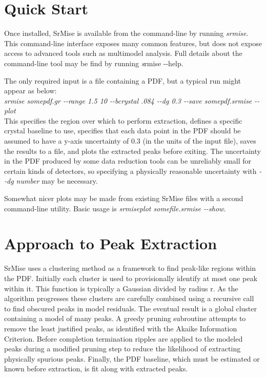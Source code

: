 \documentclass[12pt]{article}
\begin{document}
\section{Quick Start}

Once installed, {\sc SrMise} is available from the command-line by running \emph{srmise}.  This command-line interface exposes many common features, but does not expose access to advanced tools such as multimodel analysis.  Full details about the command-line tool may be find by running {\emph srmise -{}-help}.

The only required input is a file containing a PDF, but a typical run might appear as below:\\
\emph{srmise somepdf.gr -{}-range 1.5 10 -{}-bcrystal .084  -{}-dg 0.3 -{}-save somepdf.srmise -{}-plot}\\
This specifies the region over which to perform extraction, defines a specific crystal baseline to use, specifies that each data point in the PDF should be assumed to have a y-axis uncertainty of 0.3 (in the units of the input file), saves the results to a file, and plots the extracted peaks before exiting.  The uncertainty in the PDF produced by some data reduction tools can be unreliably small for certain kinds of detectors, so specifying a physically reasonable uncertainty with \emph{-{}-dg number} may be necessary.

Somewhat nicer plots may be made from existing {\sc SrMise} files with a second command-line utility.  Basic usage is \emph{srmiseplot somefile.srmise -{}-show}.

\section{Approach to Peak Extraction}
{\sc SrMise} uses a clustering method as a framework to find peak-like regions within the PDF.  Initially each cluster is used to provisionally identify at most one peak within it. This function is typically a Gaussian divided by radius r.  As the algorithm progresses these clusters are carefully combined using a recursive call to find obscured peaks in model residuals. The eventual result is a global cluster containing a model of many peaks.  A greedy pruning subroutine attempts to remove the least justified peaks, as identified with the Akaike Information Criterion.  Before completion termination ripples are applied to the modeled peaks during a modified pruning step to reduce the likelihood of extracting physically spurious peaks. Finally, the PDF baseline, which must be estimated or known
before extraction, is fit along with extracted peaks.
\end{document}
